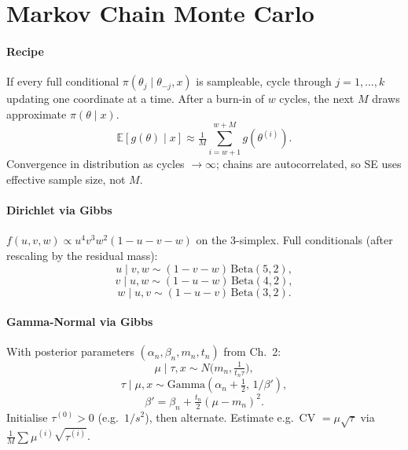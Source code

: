 
\section{Markov Chain Monte Carlo}

\paragraph{Recipe}
If every full conditional $\pi(\theta_j\mid\theta_{-j},x)$ is sampleable, cycle through $j=1,\ldots,k$ updating one coordinate at a time. After a burn-in of $w$ cycles, the next $M$ draws approximate $\pi(\theta\mid x)$.
\[\mathbb{E}[g(\theta)\mid x]\approx \tfrac{1}{M}\sum_{i=w+1}^{w+M}g(\theta^{(i)}).\]
\textcolor{Bittersweet}{Convergence in distribution} as cycles $\to\infty$; chains are autocorrelated, so SE uses effective sample size, not $M$.

\paragraph{Dirichlet via Gibbs}
$f(u,v,w)\propto u^{4}v^{3}w^{2}(1-u-v-w)$ on the 3-simplex. Full conditionals (after rescaling by the residual mass):
\[u\mid v,w\sim (1-v-w)\,\mathrm{Beta}(5,2),\]
\[v\mid u,w\sim (1-u-w)\,\mathrm{Beta}(4,2),\]
\[w\mid u,v\sim (1-u-v)\,\mathrm{Beta}(3,2).\]

\paragraph{Gamma-Normal via Gibbs}
With posterior parameters $(\alpha_n,\beta_n,m_n,t_n)$ from Ch.\ 2:
\[\mu\mid\tau,x\sim N\!\bigl(m_n,\tfrac{1}{t_n\tau}\bigr),\]
\[\tau\mid\mu,x\sim \mathrm{Gamma}(\alpha_n+\tfrac{1}{2},\,1/\beta'),\]
\[\beta'=\beta_n+\tfrac{t_n}{2}(\mu-m_n)^{2}.\]
Initialise $\tau^{(0)}>0$ (e.g.\ $1/s^{2}$), then alternate. Estimate e.g.\ CV $=\mu\sqrt{\tau}$ via $\tfrac{1}{M}\sum \mu^{(i)}\sqrt{\tau^{(i)}}$.
